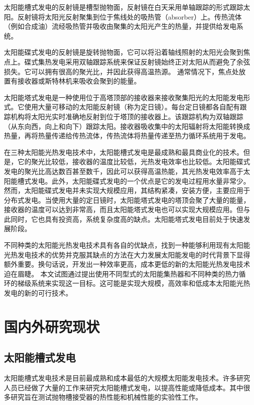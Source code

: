 太阳能槽式发电的反射镜是槽型抛物面，反射镜在白天采用单轴跟踪的形式跟踪太阳。反射镜将太阳光反射聚集到位于焦线处的吸热管（absorber）上。传热流体（例如合成油）流经吸热管并吸收由聚集的太阳光产生的热量，并提供给发电系统。
 
太阳能碟式发电的反射镜是旋转抛物面，它可以将沿着轴线照射的太阳光会聚到焦点上。碟式集热发电采用双轴跟踪系统来保证反射镜始终正对太阳从而避免了余弦损失。它可以拥有很高的聚光比，并因此获得高温热源。
通常情况下，焦点处放置有接收器或斯特林机来吸收会聚到的能量。

太阳能塔式发电是一种使用位于高塔顶部的接收器来接收聚集阳光的太阳能发电形式。它使用大量可移动的太阳能反射镜（称为定日镜）。每台定日镜都各自配有跟踪机构将太阳光实时准确地反射到位于塔顶的接收器上。该跟踪机构为双轴跟踪（从东向西，向上和向下）跟踪太阳。接收器吸收集中的太阳辐射将太阳能转换成热量，再将热量传递给传热流体，传热流体将热量传递至热力循环系统用于发电。

在三种太阳能光热发电技术中，太阳能槽式发电是最成熟和最具商业化的技术。但是，它的聚光比较低，接收器的温度比较低，光热发电效率也比较低。太阳能碟式发电的聚光比高达数百甚至数千，因此可以获得高温热能，其光热发电效率高于太阳能槽式发电。此外，太阳能碟式发电的一个优点是它的发电过程用水量非常少。然而，太阳能碟式发电并未实现大规模应用，其结构紧凑，安装方便，主要应用于分布式发电。当使用大量的定日镜时，太阳能塔式发电的塔顶会聚了大量的能量，接收器的温度可以达到非常高，而且太阳能塔式发电也可以实现大规模应用。但与此同时，它也具有投资高，系统复杂度高的缺点。太阳能塔式发电目前处于快速发展阶段。

不同种类的太阳能光热发电技术具有各自的优缺点，找到一种能够利用现有太阳能光热发电技术的优势并克服其缺点的方法在大力发展太阳能发电的时代背景下显得额外重要。换句话说，开发出一种效率更高，成本更低的新的太阳能光热发电技术迫在眉睫。
本文试图通过提出使用不同型式的太阳能集热器和不同种类的热力循环的梯级系统来实现这一目标。这可能是实现大规模，高效率和低成本太阳能光热发电的新的可行技术。

\section{国内外研究现状}

\subsection{太阳能槽式发电}

太阳能槽式发电技术是目前最成熟和成本最低的大规模太阳能发电技术\cite{Price2002}。许多研究人员已经做了大量的工作来研究太阳能槽式发电，以提高性能或降低成本。其中很多研究旨在测试抛物槽接受器的热性能和机械性能的实验性工作。

